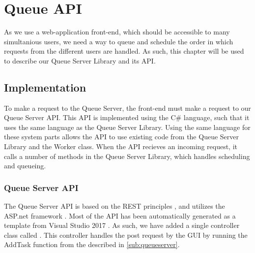 \chapter{Queue \acs{API}}\label{queueAPI}
As we use a web-application front-end, which should be accessible to many
simultanious users, we need a way to queue and schedule the order in which
requests from the different users are handled. As such, this chapter will be
used to describe our Queue Server Library and its \ac{API}.

\section{Implementation}
To make a request to the Queue Server, the front-end must make a
request to our Queue Server \ac{API}. This \ac{API} is implemented using the 
C\# language, such that it uses the same language as the Queue Server Library.
Using the same language for these system parts allows the \ac{API} to use
existing code from the Queue Server Library and the Worker class. When the
\ac{API} recieves an incoming request, it calls a number of methods in the Queue
Server Library, which handles scheduling and queueing.

\subsection{Queue Server \ac{API}}
The Queue Server \ac{API} is based on the \ac{REST} principles
\citep{principlesREST}, and utilizes the ASP.net framework
\citep{aspNEToverview}. Most of the \ac{API} has been automatically generated as
a  template from Visual Studio 2017
\citep{vsMainPage}. As such, we have added a single controller class
called . This controller handles the post
request by the \ac{GUI} by running the AddTask function from the
 described in \autoref{sub:queueserver}.

